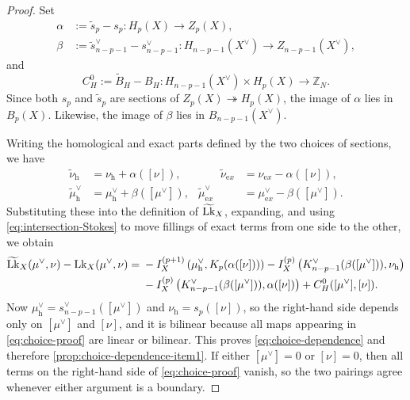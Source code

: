 \begin{proof}
	Set
	\begin{equation}
		\begin{aligned}
			\alpha&:=\widetilde s_p-s_p:H_p(X)\to Z_p(X),
			\\
			\beta&:=\widetilde s^\vee_{n-p-1}-s^\vee_{n-p-1}:H_{n-p-1}(X^\vee)\to Z_{n-p-1}(X^\vee),
		\end{aligned}
		\label{eq:secDiffs}
	\end{equation}
	and
	\begin{equation}
		C_H^{0}:=\widetilde B_H-B_H:
		H_{n-p-1}(X^\vee)\times H_p(X)\to \mathbb Z_N.
	\end{equation}
	Since both \(s_p\) and \(\widetilde s_p\) are sections of
	\(Z_p(X)\twoheadrightarrow H_p(X)\), the image of \(\alpha\) lies in \(B_p(X)\).
	Likewise, the image of \(\beta\) lies in \(B_{n-p-1}(X^\vee)\).
	
	Writing the homological and exact parts defined by the two choices of sections, we have
	\begin{equation}
		\begin{aligned}
			\widetilde\nu_{\mathrm h}&=\nu_{\mathrm h}+\alpha([\nu]),
			&\qquad
			\widetilde\nu_{\mathrm ex}&=\nu_{\mathrm ex}-\alpha([\nu]),
			\\
			\widetilde\mu^\vee_{\mathrm h}&=\mu^\vee_{\mathrm h}+\beta([\mu^\vee]),
			&
			\widetilde\mu^\vee_{\mathrm ex}&=\mu^\vee_{\mathrm ex}-\beta([\mu^\vee]).
		\end{aligned}
	\end{equation}
	Substituting these into the definition of \(\widetilde{\mathrm{Lk}}_X\), expanding, and using
	\eqref{eq:intersection-Stokes} to move fillings of exact terms from one side to the
	other, we obtain
	\begin{equation}
		\begin{aligned}
			\widetilde{\mathrm{Lk}}_X(\mu^\vee,\nu)-\mathrm{Lk}_X(\mu^\vee,\nu)
			=&\;
			-I_X^{(p+1)}\left(\mu^\vee_{\mathrm h},K_p(\alpha([\nu]))\right)
			-I_X^{(p)}\left(K^\vee_{n-p-1}(\beta([\mu^\vee])),\nu_{\mathrm h}\right)
			\\
			&\;
			-I_X^{(p)}\left(K^\vee_{n-p-1}(\beta([\mu^\vee])),\alpha([\nu])\right)
			+C_H^{0}([\mu^\vee],[\nu]).
		\end{aligned}
		\label{eq:choice-proof}
	\end{equation}
	Now \(\mu^\vee_{\mathrm h}=s^\vee_{n-p-1}([\mu^\vee])\) and
	\(\nu_{\mathrm h}=s_p([\nu])\), so the right-hand side depends only on
	\([\mu^\vee]\) and \([\nu]\), and it is bilinear because all maps appearing in
	\eqref{eq:choice-proof} are linear or bilinear. This proves
	\eqref{eq:choice-dependence} and therefore
	\ref{prop:choice-dependence-item1}. If either \([\mu^\vee]=0\) or \([\nu]=0\),
	then all terms on the right-hand side of \eqref{eq:choice-proof} vanish, so the two
	pairings agree whenever either argument is a boundary.
	

\end{proof}
